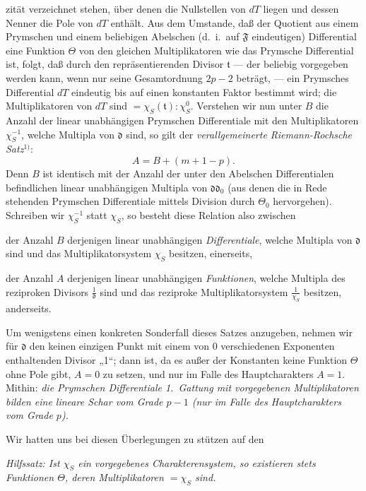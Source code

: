 \documentclass{article}
\begin{document}
zität verzeichnet stehen, über denen die Nullstellen von $dT$ liegen und dessen Nenner die Pole von $dT$ enthält. Aus dem Umstande, daß der Quotient aus einem Prymschen und einem beliebigen Abelschen (d.~i.\ auf $\mathfrak{F}$ eindeutigen) Differential eine Funktion $\Theta$ von den gleichen Multiplikatoren wie das Prymsche Differential ist, folgt, daß durch den repräsentierenden Divisor $\mathfrak{t}$ --- der beliebig vorgegeben werden kann, wenn nur seine Gesamtordnung $2p - 2$ beträgt, --- ein Prymsches Differential $dT$ eindeutig bis auf einen konstanten Faktor bestimmt wird; die Multiplikatoren von $dT$ sind $= \chi_S(\mathfrak{t}) : \chi_S^0$. Verstehen wir nun unter $B$ die Anzahl der linear unabhängigen Prymschen Differentiale mit den Multiplikatoren $\chi_S^{-1}$, welche Multipla von $\mathfrak{d}$ sind, so gilt der \emph{verallgemeinerte Riemann-Rochsche Satz}${}^{1)}$:
\[ A = B + (m + 1 - p). \]
Denn $B$ ist identisch mit der Anzahl der unter den Abelschen Differentialen befindlichen linear unabhängigen Multipla von $\mathfrak{d}\mathfrak{d}_0$ (aus denen die in Rede stehenden Prymschen Differentiale mittels Division durch $\Theta_0$ hervorgehen). Schreiben wir $\chi_S^{-1}$ statt $\chi_S$, so besteht diese Relation also zwischen

der Anzahl $B$ derjenigen linear unabhängigen \emph{Differentiale}, welche Multipla von $\mathfrak{d}$ sind und das Multiplikatorsystem $\chi_S$ besitzen, einerseits,

der Anzahl $A$ derjenigen linear unabhängigen \emph{Funktionen}, welche Multipla des reziproken Divisors $\frac{1}{\mathfrak{d}}$ sind und das reziproke Multiplikatorsystem $\frac{1}{\chi_S}$ besitzen, anderseits.

Um wenigstens einen konkreten Sonderfall dieses Satzes anzugeben, nehmen wir für $\mathfrak{d}$ den keinen einzigen Punkt mit einem von 0 verschiedenen Exponenten enthaltenden Divisor „1“; dann ist, da es außer der Konstanten keine Funktion $\Theta$ ohne Pole gibt, $A = 0$ zu setzen, und nur im Falle des Hauptcharakters $A = 1$. Mithin: \emph{die Prymschen Differentiale 1.\ Gattung mit vorgegebenen Multiplikatoren bilden eine lineare Schar vom Grade $p - 1$ (nur im Falle des Hauptcharakters vom Grade $p$).}

Wir hatten uns bei diesen Überlegungen zu stützen auf den

\emph{Hilfssatz: Ist $\chi_S$ ein vorgegebenes Charakterensystem, so existieren stets Funktionen $\Theta$, deren Multiplikatoren $= \chi_S$ sind.}
\end{document}
